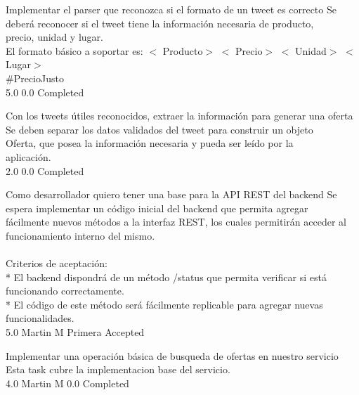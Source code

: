		{Implementar el parser que reconozca si el formato de un tweet es correcto} %
		{Se deberá reconocer si el tweet tiene la información necesaria de producto,\\
precio, unidad y lugar.\\
El formato básico a soportar es: $<$ Producto$>$  $<$ Precio$>$  $<$ Unidad$>$  $<$ Lugar$>$ \\
#PrecioJusto\\
} %
		{5.0} %
		{} %
		{0.0} %
		{Completed} %

		{Con los tweets útiles reconocidos, extraer la información para generar una oferta} %
		{Se deben separar los datos validados del tweet para construir un objeto\\
Oferta, que posea la información necesaria y pueda ser leído por la\\
aplicación.\\
} %
		{2.0} %
		{} %
		{0.0} %
		{Completed} %


\vspace{20pt}

	{Como desarrollador quiero tener una base para la API REST del backend} %
	{Se espera implementar un código inicial del backend que permita agregar\\
fácilmente nuevos métodos a la interfaz REST, los cuales permitirán acceder al\\
funcionamiento interno del mismo.\\
  \\
Criterios de aceptación:\\
* El backend dispondrá de un método /status que permita verificar si está funcionando correctamente.   \\
* El código de este método será fácilmente replicable para agregar nuevas funcionalidades.\\
} %
	{} %
	{5.0} %
	{Martin M} %
	{Primera} %
	{Accepted} %

		{Implementar una operación básica de busqueda de ofertas en nuestro servicio} %
		{Esta task cubre la implementacion base del servicio.\\
} %
		{4.0} %
		{Martin M} %
		{0.0} %
		{Completed} %

